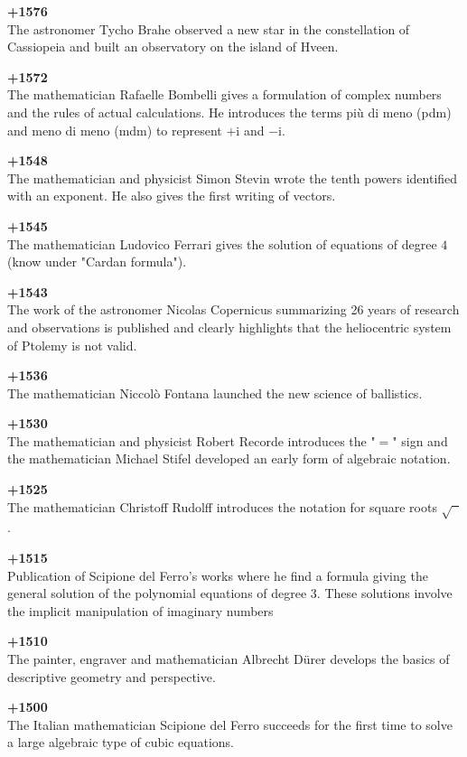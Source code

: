 \textbf{+1576}\\
The astronomer Tycho Brahe observed a new star in the constellation of Cassiopeia and built an observatory on the island of Hveen.

\textbf{+1572}\\
The mathematician Rafaelle Bombelli gives a formulation of complex numbers and the rules of actual calculations. He introduces the terms più di meno (pdm) and meno di meno (mdm) to represent $+\mathrm{i}$ and $-\mathrm{i}$.

\textbf{+1548}\\
The mathematician and physicist Simon Stevin wrote the tenth powers identified with an exponent. He also gives the first writing of vectors. 

\textbf{+1545}\\
The mathematician Ludovico Ferrari gives the solution of equations of degree $4$ (know under "Cardan formula").

\textbf{+1543}\\
The work of the astronomer Nicolas Copernicus summarizing 26 years of research and observations is published and clearly highlights that the heliocentric system of Ptolemy is not valid.

\textbf{+1536}\\
The mathematician Niccolò Fontana launched the new science of ballistics.

\textbf{+1530}\\
The mathematician and physicist Robert Recorde introduces the "$=$" sign and the mathematician Michael Stifel developed an early form of algebraic notation.

\textbf{+1525}\\
The mathematician Christoff Rudolff introduces the notation for square roots $\sqrt{\phantom{a}}$.

\textbf{+1515}\\
Publication of Scipione del Ferro's works where he find a formula giving the general solution of the polynomial equations of degree $3$. These solutions involve the implicit manipulation of imaginary numbers

\textbf{+1510}\\
The painter, engraver and mathematician Albrecht Dürer develops the basics of descriptive geometry and perspective.

\textbf{+1500}\\
The Italian mathematician Scipione del Ferro succeeds for the first time to solve a large algebraic type of cubic equations.

